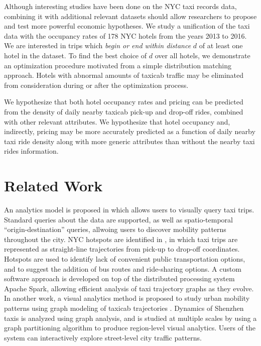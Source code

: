 \documentclass[useAMS, referee, usenatbib]{biom}
\begin{document}
Although interesting studies have been done on the NYC taxi records data, combining it with additional relevant datasets should allow researchers to propose and test more powerful economic hypotheses. We study a unification of the taxi data with the occupancy rates of 178 NYC hotels from the years 2013 to 2016. We are interested in trips which \textit{begin or end within distance} $d$ of at least one hotel in the dataset. To find the best choice of $d$ over all hotels, we demonstrate an optimization procedure motivated from a simple distribution matching approach. Hotels with abnormal amounts of taxicab traffic may be eliminated from consideration during or after the optimization process.

We hypothesize that both hotel occupancy rates and pricing can be predicted from the density of daily nearby taxicab pick-up and drop-off rides, combined with other relevant attributes. We hypothesize that hotel occupancy and, indirectly, pricing may be more accurately predicted as a function of daily nearby taxi ride density along with more generic attributes than without the nearby taxi rides information.

\section{Related Work}
\label{s:related}

An analytics model is proposed in \citet{Ferreira2013VisualEO} which allows users to visually query taxi trips. Standard queries about the data are supported, as well as spatio-temporal ``origin-destination'' queries, allwoing users to discover mobility patterns throughout the city. NYC hotspots are identified in \citet{Stoyanovich2017ZoomingIO}, in which taxi trips are represented as straight-line trajectories from pick-up to drop-off coordinates. Hotspots are used to identify lack of convenient public transportation options, and to suggest the addition of bus routes and ride-sharing options. A custom software approach is developed on top of the distributed processing system Apache Spark, allowing efficient analysis of taxi trajectory graphs as they evolve. In another work, a visual analytics method is proposed to study urban mobility patterns using graph modeling of taxicab trajectories \citep{Huang2016TrajGraphAG}. Dynamics of Shenzhen taxis is analyzed using graph analysis, and is studied at multiple scales by using a graph partitioning algorithm to produce region-level visual analytics. Users of the system can interactively explore street-level city traffic patterns. 
\end{document}
